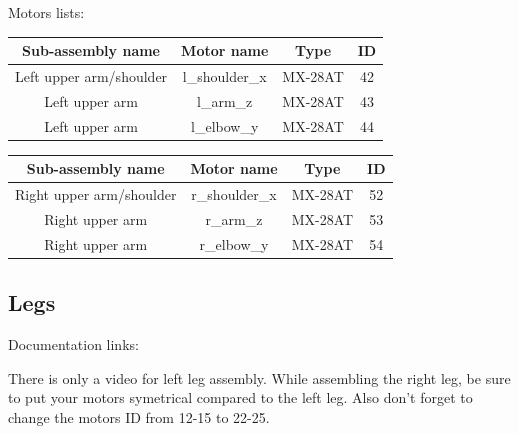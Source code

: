 \documentclass{article}
\begin{document}
Motors lists:

\begin{center}

\begin{tabular}{|c|c|c|c|}
\hline 
Sub-assembly name & Motor name & Type & ID \\ 
\hline 

Left upper arm/shoulder & l\_shoulder\_x & MX-28AT & 42 \\ 
\hline 
Left upper arm & l\_arm\_z & MX-28AT & 43 \\
\hline 
Left upper arm & l\_elbow\_y & MX-28AT & 44 \\
\hline 

\end{tabular} 
\end{center}

\begin{center}
\begin{tabular}{|c|c|c|c|}
\hline 
Sub-assembly name & Motor name & Type & ID \\ 
\hline 

Right upper arm/shoulder & r\_shoulder\_x & MX-28AT & 52 \\ 
\hline 
Right upper arm & r\_arm\_z & MX-28AT & 53 \\
\hline 
Right upper arm & r\_elbow\_y & MX-28AT & 54 \\
\hline 

\end{tabular} 
\end{center}


\subsection{Legs} 
 
Documentation links:

There is only a video for left leg assembly. While assembling the right leg, be sure to put your motors symetrical compared to the left leg. Also don't forget to change the motors ID from 12-15 to 22-25.
\end{document}
